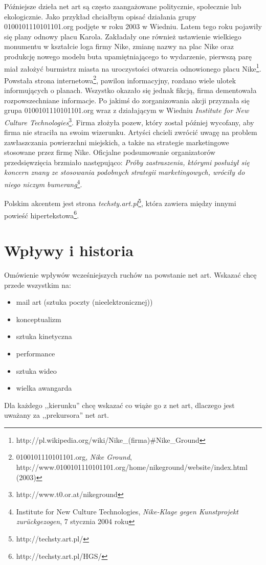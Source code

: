 \documentclass[a4paper,12pt]{article}
\begin{document}
Późniejsze dzieła net art są często zaangażowane politycznie, społecznie
lub ekologicznie. Jako przykład chciałbym opisać działania grupy
0100101110101101.org podjęte w roku 2003 w Wiedniu. Latem tego roku
pojawiły się plany odnowy placu Karola. Zakładały one również ustawienie
wielkiego monumentu w kształcie loga firmy Nike, zmianę nazwy na
plac Nike oraz produkcję nowego modelu buta upamiętniającego to wydarzenie,
pierwszą parę miał założyć burmistrz miasta na uroczystości otwarcia
odnowionego placu
Nike\footnote{http://pl.wikipedia.org/wiki/Nike\_(firma)\#Nike\_Ground}.
Powstała strona
internetowa\footnote{0100101110101101.org, \textit{Nike Ground}, 
http://www.0100101110101101.org/home/nikeground/website/index.html (2003)},
pawilon informacyjny, rozdano wiele ulotek informujących o planach.
Wszystko okazało się jednak fikcją, firma dementowała rozpowszechniane
informacje. Po jakimś do zorganizowania akcji przyznała się
grupa 0100101110101101.org wraz z działającym w Wiedniu \textit{Institute
for New Culture Technologies}\footnote{http://www.t0.or.at/nikeground}.
Firma złożyła pozew, który został później wycofany, aby firma nie straciła
na swoim wizerunku. Artyści chcieli zwrócić uwagę na problem zawłaszczania
powierzchni miejskich, a także na strategie marketingowe stosowane przez
firmę Nike. Oficjalne podsumowanie organizatorów przedsięwzięcia brzmiało
następująco: \textit{Próby zastraszenia, którymi posłużył się koncern znany
ze stosowania podobnych strategii marketingowych, wróciły do niego niczym
bumerang}\footnote{Institute for New Culture Technologies,
\textit{Nike-Klage gegen Kunstprojekt zurückgezogen}, 7 stycznia 2004 roku}.


Polskim akcentem jest strona
\textit{techsty.art.pl}\footnote{http://techsty.art.pl/},
która zawiera między innymi powieść
hipertekstowa\footnote{http://techsty.art.pl/HGS/}.

\section{Wpływy i historia}
Omówienie wpływów wcześniejszych ruchów na powstanie net art.
Wskazać chcę przede wszystkim na:
\begin{itemize}
\item mail art (sztuka poczty (nieelektronicznej))
\item konceptualizm
\item sztuka kinetyczna
\item performance
\item sztuka wideo
\item wielka awangarda
\end{itemize}
Dla każdego ,,kierunku'' chcę wskazać co wiąże go z net art,
dlaczego jest uważany za ,,prekursora'' net art.
\end{document}
